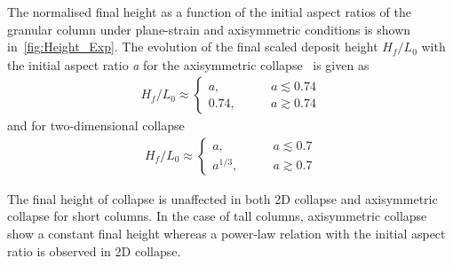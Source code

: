 The normalised final height as a function of the initial aspect ratios of 
the granular column under plane-strain and axisymmetric conditions is 
shown in~\cref{fig:Height_Exp}. The evolution of the final scaled deposit 
height $\textit{H}_{\textit{f}}/\textit{L}_{\textit{0}}$ with the initial 
aspect ratio \textit{a} for the axisymmetric collapse~\citep{Lajeunesse2005} 
is given as 
\begin{align}
\textit{H}_{\textit{f}}/\textit{L}_{\textit{0}} \approx 
\begin{cases}
\textit{a}, \qquad &\textit{a}\lesssim 0.74 \\
0.74, \qquad &\textit{a}\gtrsim 0.74
\end{cases}
\end{align}
and for two-dimensional collapse
\begin{align}
\textit{H}_{\textit{f}}/\textit{L}_{\textit{0}} \approx 
\begin{cases}
\textit{a}, \qquad &\textit{a}\lesssim 0.7 \\
\textit{a}^{1/3}, \qquad &\textit{a}\gtrsim 0.7
\end{cases}
\end{align}

The final height of collapse is unaffected in both 2D collapse and 
axisymmetric collapse for short columns. In the case of tall columns, 
axisymmetric collapse show a constant final height whereas a power-law 
relation with the initial aspect ratio is observed in 2D collapse.

